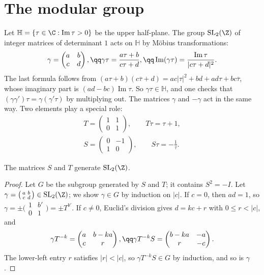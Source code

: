 \section{The modular group}

Let $\mathbb H=\{\tau\in\C:\operatorname{Im}\tau>0\}$ be the upper half-plane. The group $\mathrm{SL}_2(\Z)$ of integer matrices of determinant $1$ acts on $\mathbb H$ by Möbius transformations:
\[
\gamma=\begin{pmatrix}a&b\\c&d\end{pmatrix},\qq\gamma\tau=\frac{a\tau+b}{c\tau+d},\qq\operatorname{Im}(\gamma\tau)=\frac{\operatorname{Im}\tau}{|c\tau+d|^2}.
\]
The last formula follows from $(a\tau+b)(c\overline\tau+d)=ac|\tau|^2+bd+ad\tau+bc\overline\tau$, whose imaginary part is $(ad-bc)\operatorname{Im}\tau$. So $\gamma\tau\in\mathbb H$, and one checks that $(\gamma\gamma')\tau=\gamma(\gamma'\tau)$
by multiplying out. The matrices $\gamma$ and $-\gamma$ act in the same way. Two elements play a special role:
\[
\begin{gathered}T=\begin{pmatrix}1&1\\0&1\end{pmatrix},\qquad T\tau=\tau+1,\\S=\begin{pmatrix}0&-1\\1&0\end{pmatrix},\qquad S\tau=-\frac1\tau.\end{gathered}
\]

\begin{proposition}\label{prop:generators}
The matrices $S$ and $T$ generate $\mathrm{SL}_2(\Z)$.
\end{proposition}

\begin{proof}
Let $G$ be the subgroup generated by $S$ and $T$; it contains $S^2=-I$. Let $\gamma=\bigl(\begin{smallmatrix}a&b\\c&d\end{smallmatrix}\bigr)\in\mathrm{SL}_2(\Z)$; we show $\gamma\in G$ by induction on $|c|$. If $c=0$, then $ad=1$, so $\gamma=\pm\bigl(\begin{smallmatrix}1&b'\\0&1\end{smallmatrix}\bigr)=\pm T^{b'}$.
If $c\ne0$, Euclid's division gives $d=kc+r$ with $0\le r<|c|$, and
\[
\gamma T^{-k}=\begin{pmatrix}a&b-ka\\c&r\end{pmatrix},\qq\gamma T^{-k}S=\begin{pmatrix}b-ka&-a\\r&-c\end{pmatrix}.
\]
The lower-left entry $r$ satisfies $|r|<|c|$, so $\gamma T^{-k}S\in G$ by induction, and so is $\gamma$.
\end{proof}

